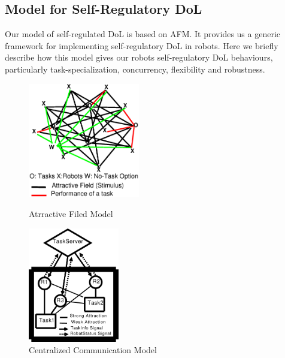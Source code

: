 \documentclass{llncs}
\begin{document}
\subsection{Model for Self-Regulatory DoL}
Our model of self-regulated DoL is based on AFM. It provides us a generic framework for implementing self-regulatory DoL in robots. Here we briefly describe how this model gives our robots self-regulatory DoL behaviours, particularly task-specialization, concurrency, flexibility and robustness.
\begin{figure}
\begin{minipage}[t]{0.48\linewidth}
\centering
\includegraphics[height=5cm, angle=0]
{../dia-files/AFM-Diag2.eps}
\caption{\small Atrractive Filed Model}
\label{fig:afm} %
\end{minipage}
\hspace{0.5cm}
\begin{minipage}[t]{0.48\linewidth}
\centering
\includegraphics[height=5cm, angle=0]{../dia-files/CentralizedComm.eps}
\caption{\small Centralized Communication Model}
\label{fig:ccm} %
\end{minipage}
\end{figure}
\end{document}
